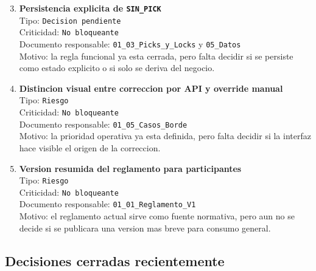 \begin{enumerate}
  \setcounter{enumi}{2}
  \item \textbf{Persistencia explicita de \texttt{SIN\_PICK}}\\
  Tipo: \texttt{Decision pendiente}\\
  Criticidad: \texttt{No bloqueante}\\
  Documento responsable: \texttt{01\_03\_Picks\_y\_Locks} y \texttt{05\_Datos}\\
  Motivo: la regla funcional ya esta cerrada, pero falta decidir si se persiste como estado explicito o si solo se deriva del negocio.

  \item \textbf{Distincion visual entre correccion por API y override manual}\\
  Tipo: \texttt{Riesgo}\\
  Criticidad: \texttt{No bloqueante}\\
  Documento responsable: \texttt{01\_05\_Casos\_Borde}\\
  Motivo: la prioridad operativa ya esta definida, pero falta decidir si la interfaz hace visible el origen de la correccion.

  \item \textbf{Version resumida del reglamento para participantes}\\
  Tipo: \texttt{Riesgo}\\
  Criticidad: \texttt{No bloqueante}\\
  Documento responsable: \texttt{01\_01\_Reglamento\_V1}\\
  Motivo: el reglamento actual sirve como fuente normativa, pero aun no se decide si se publicara una version mas breve para consumo general.
\end{enumerate}

\subsection{Decisiones cerradas recientemente}

